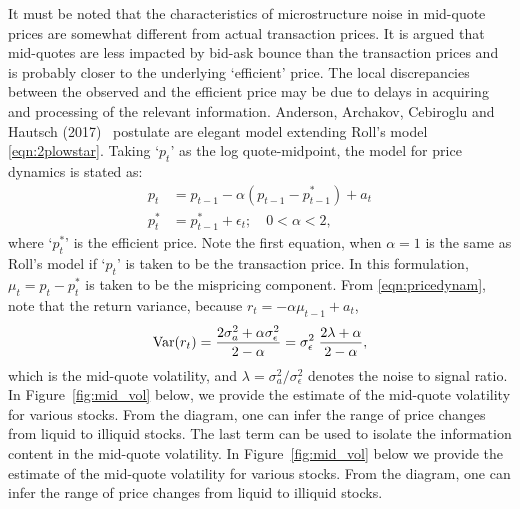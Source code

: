 It must be noted that the characteristics of microstructure noise in mid-quote prices are somewhat different from actual transaction prices. It is argued that mid-quotes are less impacted by bid-ask bounce than the transaction prices and is probably closer to the underlying `efficient' price. The local discrepancies between the observed and the efficient price may be due to delays in acquiring and processing of the relevant information. Anderson, Archakov, Cebiroglu and Hautsch (2017)~\cite{archcebha17} postulate are elegant model extending Roll's model \eqref{eqn:2plowstar}. Taking `$p_t$' as the log quote-midpoint, the model for price dynamics is stated as:
	\begin{equation}\label{eqn:pricedynam}	
	\begin{aligned}
	p_t&= p_{t-1} - \alpha (p_{t-1} - p_{t-1}^*) + a_t \\
	p_t^*&= p_{t-1}^* + \epsilon_t; \quad 0<\alpha<2,
	\end{aligned}
	\end{equation}
where `$p_t^*$' is the efficient price. Note the first equation, when $\alpha=1$ is the same as Roll's model if `$p_t$' is taken to be the transaction price. In this formulation, $\mu_t= p_t - p_t^*$ is taken to be the mispricing component. From \eqref{eqn:pricedynam}, note that the return variance, because $r_t= -\alpha \mu_{t-1} + a_t$,
	\begin{equation}  \label{eqn:signalrationoise}
	\var(r_t)= \dfrac{2\sigma_a^2 + \alpha \sigma_\epsilon^2}{2 - \alpha}= \sigma_\epsilon^2\;  \dfrac{2\lambda + \alpha}{2-\alpha},
	\end{equation}
which is the mid-quote volatility, and $\lambda= \sigma_a^2/\sigma_\epsilon^2$ denotes the noise to signal ratio. In Figure~\ref{fig:mid_vol} below, we provide the estimate of the mid-quote volatility for various stocks. From the diagram, one can infer the range of price changes from liquid to illiquid stocks. The last term can be used to isolate the information content in the mid-quote volatility. In Figure~\ref{fig:mid_vol} below we provide the estimate of the mid-quote volatility for various stocks. From the diagram, one can infer the range of price changes from liquid to illiquid stocks. 

